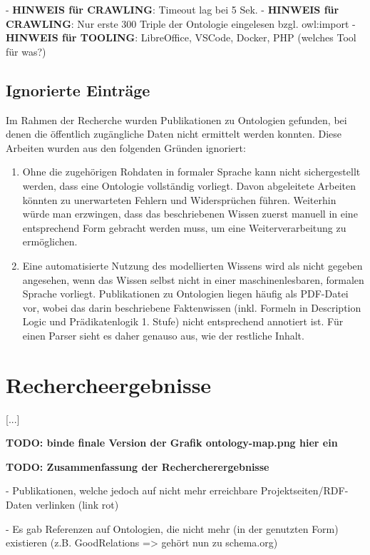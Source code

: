 \documentclass{article}
\begin{document}
- \textbf{HINWEIS für CRAWLING}: Timeout lag bei 5 Sek.
- \textbf{HINWEIS für CRAWLING}: Nur erste 300 Triple der Ontologie eingelesen bzgl. owl:import
- \textbf{HINWEIS für TOOLING}: LibreOffice, VSCode, Docker, PHP (welches Tool für was?)

\subsection{Ignorierte Einträge}

Im Rahmen der Recherche wurden Publikationen zu Ontologien gefunden, bei denen die öffentlich zugängliche Daten nicht ermittelt werden konnten.
Diese Arbeiten wurden aus den folgenden Gründen ignoriert:
\begin{enumerate}
    \item Ohne die zugehörigen Rohdaten in formaler Sprache kann nicht sichergestellt werden, dass eine Ontologie vollständig vorliegt. Davon abgeleitete Arbeiten könnten zu unerwarteten Fehlern und Widersprüchen führen. Weiterhin würde man erzwingen, dass das beschriebenen Wissen zuerst manuell in eine entsprechend Form gebracht werden muss, um eine Weiterverarbeitung zu ermöglichen.
    \item Eine automatisierte Nutzung des modellierten Wissens wird als nicht gegeben angesehen, wenn das Wissen selbst nicht in einer maschinenlesbaren, formalen Sprache vorliegt. Publikationen zu Ontologien liegen häufig als PDF-Datei vor, wobei das darin beschriebene Faktenwissen (inkl. Formeln in Description Logic und Prädikatenlogik 1. Stufe) nicht entsprechend annotiert ist. Für einen Parser sieht es daher genauso aus, wie der restliche Inhalt.
\end{enumerate}


\section{Rechercheergebnisse}

[...]

\textbf{TODO: binde finale Version der Grafik ontology-map.png hier ein}

\textbf{TODO: Zusammenfassung der Rechercherergebnisse}

- Publikationen, welche jedoch auf nicht mehr erreichbare Projektseiten/RDF-Daten verlinken (link rot)

- Es gab Referenzen auf Ontologien, die nicht mehr (in der genutzten Form) existieren (z.B. GoodRelations => gehört nun zu schema.org)
\end{document}
